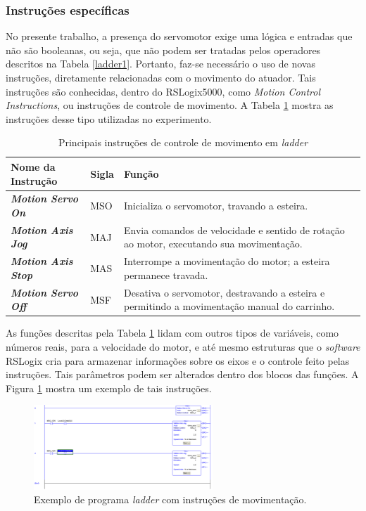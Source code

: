 \subsubsection{Instruções específicas}
No presente trabalho, a presença do servomotor exige uma lógica e entradas que não são booleanas, ou seja, que não podem ser tratadas pelos operadores descritos na Tabela \ref{ladder1}. Portanto, faz-se necessário o uso de novas instruções, diretamente relacionadas com o movimento do atuador. Tais instruções são conhecidas, dentro do RSLogix5000, como \textit{Motion Control Instructions}, ou instruções de controle de movimento. A Tabela \ref{ladder2} mostra as instruções desse tipo utilizadas no experimento.

\begin{table}[!ht]
  \centering
  \caption{Principais instruções de controle de movimento em \textit{ladder} \label{ladder2}}
  \begin{tabularx}{\textwidth}{|>{\bfseries}l|l|X|}
    \hline
    Nome da Instrução & Sigla & Função \\ \hline
    \textit{Motion Servo On} & MSO & Inicializa o servomotor, travando a esteira. \\ \hline
    \textit{Motion Axis Jog} & MAJ & Envia comandos de velocidade e sentido de rotação ao motor, executando sua movimentação. \\ \hline
    \textit{Motion Axis Stop} & MAS & Interrompe a movimentação do motor; a esteira permanece travada. \\ \hline
    \textit{Motion Servo Off} & MSF & 
    Desativa o servomotor, destravando a esteira e permitindo a movimentação manual do carrinho.\\ \hline
  \end{tabularx}
\end{table}

As funções descritas pela Tabela \ref{ladder2} lidam com outros tipos de variáveis, como números reais, para a velocidade do motor, e até mesmo estruturas que o \textit{software} RSLogix cria para armazenar informações sobre os eixos e o controle feito pelas instruções. Tais parâmetros podem ser alterados dentro dos blocos das funções. A Figura \ref{motionladder1} mostra um exemplo de tais instruções.

\begin{figure}[!ht]
  \centering
    \includegraphics[width=0.6\textwidth]{figs/fundamentos/motionladder}
    \caption{Exemplo de programa \textit{ladder} com instruções de movimentação.\label{motionladder1}}
\end{figure}

